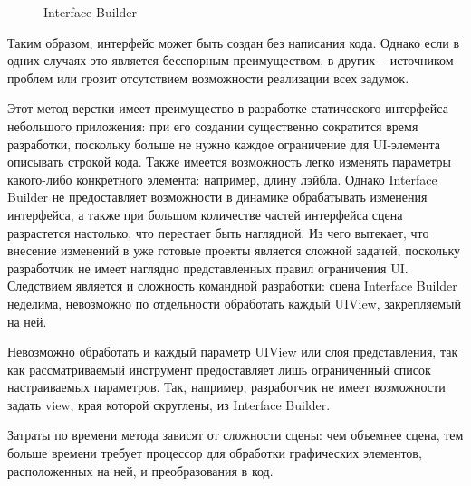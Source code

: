 \begin{figure}[h!]
	\caption{Interface Builder}
	\label{fig:frame}
\end{figure}

Таким образом, интерфейс может быть создан без написания кода. Однако если в одних случаях это является бесспорным преимуществом, в других -- источником проблем или грозит отсутствием возможности реализации всех задумок.

Этот метод верстки имеет преимущество в разработке статического интерфейса небольшого приложения: при его создании существенно сократится время разработки, поскольку больше не нужно каждое ограничение для UI-элемента описывать строкой кода. Также имеется возможность легко изменять параметры какого-либо конкретного элемента: например, длину лэйбла. Однако Interface Builder не предоставляет возможности в динамике обрабатывать изменения интерфейса, а также при большом количестве частей интерфейса сцена разрастется настолько, что перестает быть наглядной. Из чего вытекает, что внесение изменений в уже готовые проекты является сложной задачей, поскольку разработчик не имеет наглядно представленных правил ограничения UI. Следствием является и сложность командной разработки: сцена Interface Builder неделима, невозможно по отдельности обработать каждый UIView, закрепляемый на ней.

Невозможно обработать и каждый параметр UIView или слоя представления, так как рассматриваемый инструмент предоставляет лишь ограниченный список настраиваемых параметров. Так, например, разработчик не имеет возможности задать view, края которой скруглены, из Interface Builder.

Затраты по времени метода зависят от сложности сцены: чем объемнее сцена, тем больше времени требует процессор для обработки графических элементов, расположенных на ней, и преобразования в код. 


